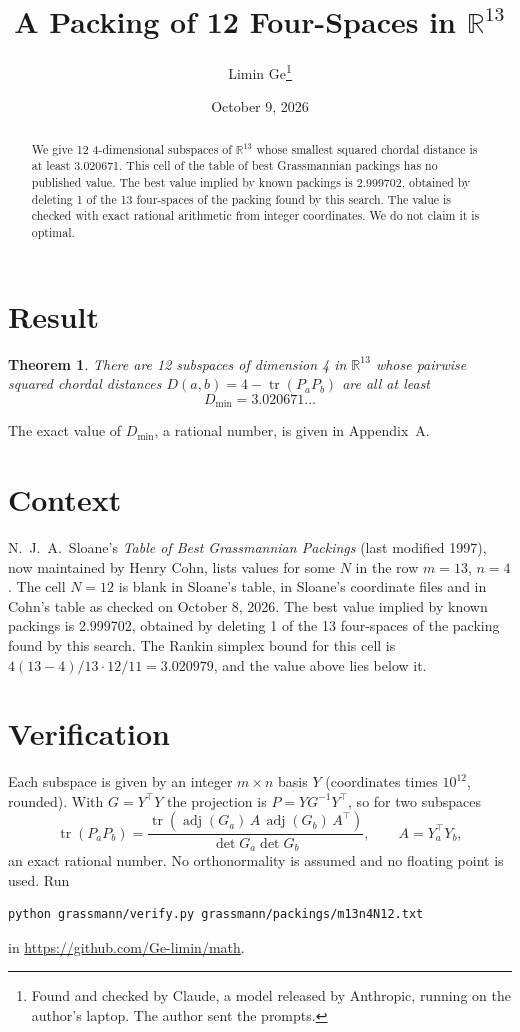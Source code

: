 \documentclass[11pt,a4paper]{article}
\title{A Packing of 12 Four-Spaces in $\mathbb{R}^{13}$}
\author{Limin Ge\thanks{Found and checked by Claude, a model released by Anthropic, running on the author's laptop. The author sent the prompts.}}
\date{October 9, 2026}
\newtheorem*{theorem}{Theorem}
\begin{document}
\maketitle
\begin{abstract}
We give 12 4-dimensional subspaces of $\mathbb{R}^{13}$ whose smallest squared chordal distance is at least 3.020671. This cell of the table of best Grassmannian packings has no published value. The best value implied by known packings is 2.999702, obtained by deleting 1 of the 13 four-spaces of the packing found by this search. The value is checked with exact rational arithmetic from integer coordinates. We do not claim it is optimal.
\end{abstract}

\section{Result}
\begin{theorem}
There are 12 subspaces of dimension 4 in $\mathbb{R}^{13}$ whose pairwise squared chordal distances $D(a,b) = 4 - \operatorname{tr}(P_aP_b)$ are all at least
\[ D_{\min} = 3.020671\ldots \]
\end{theorem}
The exact value of $D_{\min}$, a rational number, is given in Appendix~A.


\section{Context}
N.~J.~A.~Sloane's \emph{Table of Best Grassmannian Packings} (last modified 1997), now maintained by Henry Cohn, lists values for some $N$ in the row $m=13$, $n=4$. The cell $N=12$ is blank in Sloane's table, in Sloane's coordinate files and in Cohn's table as checked on October 8, 2026. The best value implied by known packings is 2.999702, obtained by deleting 1 of the 13 four-spaces of the packing found by this search. The Rankin simplex bound for this cell is $4(13-4)/13\cdot 12/11 = 3.020979$, and the value above lies below it.


\section{Verification}
Each subspace is given by an integer $m\times n$ basis $Y$ (coordinates times $10^{12}$, rounded). With $G=Y^\top Y$ the projection is $P=YG^{-1}Y^\top$, so for two subspaces
\[ \operatorname{tr}(P_aP_b)=\frac{\operatorname{tr}(\operatorname{adj}(G_a)\,A\,\operatorname{adj}(G_b)\,A^\top)}{\det G_a\det G_b},\qquad A=Y_a^\top Y_b, \]
an exact rational number. No orthonormality is assumed and no floating point is used. Run
\begin{verbatim}
python grassmann/verify.py grassmann/packings/m13n4N12.txt
\end{verbatim}
in \url{https://github.com/Ge-limin/math}.
\end{document}
